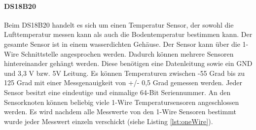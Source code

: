 \paragraph{DS18B20} Beim DS18B20 handelt es sich um einen Temperatur Sensor, der sowohl die Lufttemperatur messen kann als auch die Bodentemperatur bestimmen kann. Der gesamte Sensor ist in einem wasserdichten Gehäuse. Der Sensor kann über die 1-Wire Schnittstelle angesprochen werden. Dadurch können mehrere Sensoren hintereinander gehängt werden. Diese benötigen eine Datenleitung sowie ein GND und 3,3 V bzw. 5V Leitung. Es können Temperaturen zwischen -55 Grad bis zu 125 Grad mit einer Messgenauigkeit von +/- 0,5 Grad gemessen werden. Jeder Sensor besitzt eine eindeutige und einmalige 64-Bit Seriennummer. An den Sensorknoten können beliebig viele 1-Wire Temperatursensoren angeschlossen werden. Es wird nachdem alle Messwerte von den 1-Wire Sensoren bestimmt wurde jeder Messwert einzeln verschickt (siehe Listing \ref{lst:oneWire}).

